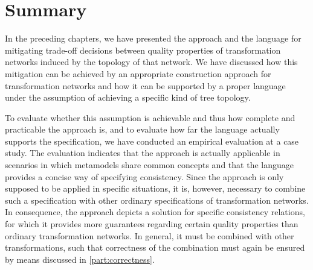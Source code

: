 \section{Summary}

In the preceding chapters, we have presented the \commonalities approach and the \commonalities language for mitigating trade-off decisions between quality properties of transformation networks induced by the topology of that network.
We have discussed how this mitigation can be achieved by an appropriate construction approach for transformation networks and how it can be supported by a proper language under the assumption of achieving a specific kind of tree topology.

To evaluate whether this assumption is achievable and thus how complete and practicable the approach is, and to evaluate how far the language actually supports the specification, we have conducted an empirical evaluation at a case study.
The evaluation indicates that the approach is actually applicable in scenarios in which metamodels share common concepts and that the language provides a concise way of specifying consistency.
Since the approach is only supposed to be applied in specific situations, it is, however, necessary to combine such a specification with other ordinary specifications of transformation networks.
In consequence, the \commonalities approach depicts a solution for specific consistency relations, for which it provides more guarantees regarding certain quality properties than ordinary transformation networks.
In general, it must be combined with other transformations, such that correctness of the combination must again be ensured by means discussed in \autoref{part:correctness}.

